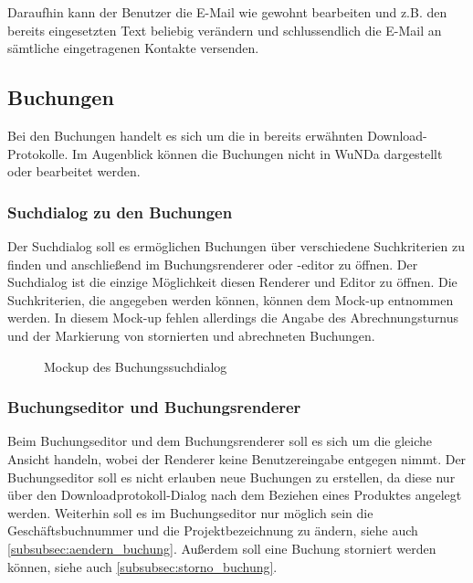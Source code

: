 Daraufhin kann der Benutzer die E-Mail wie gewohnt bearbeiten und z.B. den bereits eingesetzten Text beliebig verändern und schlussendlich die E-Mail an sämtliche eingetragenen Kontakte versenden.


\subsection{Buchungen}
Bei den Buchungen handelt es sich um die in  bereits erwähnten Download-Protokolle. Im Augenblick können die Buchungen nicht in \ac{WuNDa} dargestellt oder bearbeitet werden.


\subsubsection{Suchdialog zu den Buchungen}
Der Suchdialog soll es ermöglichen Buchungen über verschiedene Suchkriterien zu finden und anschließend im Buchungsrenderer oder -editor zu öffnen.
Der Suchdialog ist die einzige Möglichkeit diesen Renderer und Editor zu öffnen. Die Suchkriterien, die angegeben werden können, können dem Mock-up  entnommen werden. In diesem Mock-up fehlen allerdings die Angabe des Abrechnungsturnus und der Markierung von stornierten und abrechneten Buchungen.  
\begin{figure}[htbp]
	\centering
	\caption{Mockup des Buchungssuchdialog}
	\label{fig:mockup-buchungssuchdialog}
\end{figure}

\subsubsection{Buchungseditor und Buchungsrenderer}
Beim Buchungseditor und dem Buchungsrenderer soll es sich um die gleiche Ansicht handeln, wobei der Renderer keine Benutzereingabe entgegen nimmt.
Der Buchungseditor soll es nicht erlauben neue Buchungen zu erstellen, da diese nur über den Downloadprotokoll-Dialog nach dem Beziehen eines Produktes angelegt werden.
Weiterhin soll es im Buchungseditor nur möglich sein die Geschäftsbuchnummer und die Projektbezeichnung zu ändern, siehe auch \ref{subsubsec:aendern_buchung}.
Außerdem soll eine Buchung storniert werden können, siehe auch \ref{subsubsec:storno_buchung}.

